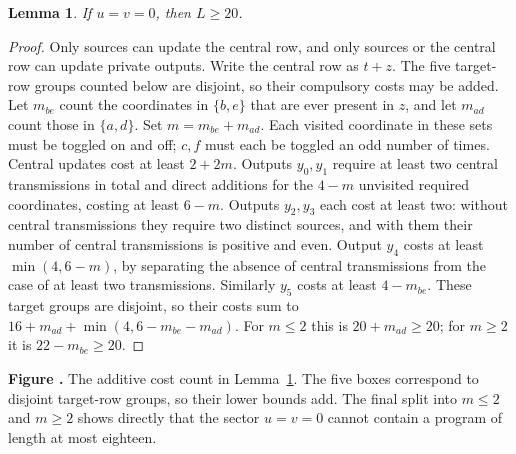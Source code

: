 \documentclass[11pt]{article}
\newtheorem{lemma}[theorem]{Lemma}
\newcommand{\prooffigure}[3]{%
  \begin{center}
  \begin{minipage}{.98\linewidth}
  \centering
  \resizebox{\linewidth}{!}{}\par
  \refstepcounter{figure}\label{#2}%
  \small\textbf{Figure \thefigure.} #3
  \end{minipage}
  \end{center}}
\begin{document}
\begin{lemma}\label{lem:zero} If $u=v=0$, then $L\ge20$.\end{lemma}
\begin{proof}
Only sources can update the central row, and only sources or the central
row can update private outputs. Write the central row as $t+z$.
The five target-row groups counted below are disjoint, so their compulsory
costs may be added. Let $m_{be}$ count the coordinates in $\{b,e\}$ that are
ever present in $z$, and let $m_{ad}$ count those in $\{a,d\}$. Set
$m=m_{be}+m_{ad}$.
Each visited coordinate in these sets must be toggled on and off;
$c,f$ must each be toggled an odd number of times. Central updates cost
at least $2+2m$.
Outputs $y_0,y_1$ require at least two central transmissions in total
and direct additions for the $4-m$ unvisited required coordinates,
costing at least $6-m$. Outputs $y_2,y_3$ each cost at least two:
without central transmissions they require two distinct sources, and
with them their number of central transmissions is positive and even.
Output $y_4$ costs at least $\min(4,6-m)$, by separating the absence
of central transmissions from the case of at least two transmissions.
Similarly $y_5$ costs at least $4-m_{be}$.
These target groups are disjoint, so their costs sum to
$16+m_{ad}+\min(4,6-m_{be}-m_{ad})$.
For $m\le2$ this is $20+m_{ad}\ge20$; for $m\ge2$ it is
$22-m_{be}\ge20$.
\end{proof}
\prooffigure{zero_sector_cost}{fig:zero-sector}{The additive cost count in
Lemma~\ref{lem:zero}. The five boxes correspond to disjoint target-row
groups, so their lower bounds add. The final split into $m\le2$ and $m\ge2$
shows directly that the sector $u=v=0$ cannot contain a program of length at
most eighteen.}
\end{document}

